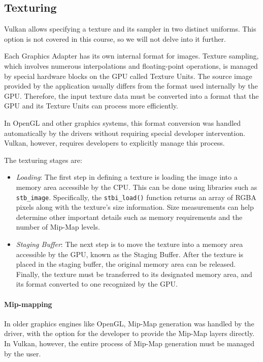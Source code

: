 \subsection{Texturing}
Vulkan allows specifying a texture and its sampler in two distinct uniforms. 
This option is not covered in this course, so we will not delve into it further.

Each Graphics Adapter has its own internal format for images.
Texture sampling, which involves numerous interpolations and floating-point operations, is managed by special hardware blocks on the GPU called Texture Units. 
The source image provided by the application usually differs from the format used internally by the GPU. 
Therefore, the input texture data must be converted into a format that the GPU and its Texture Units can process more efficiently.

In OpenGL and other graphics systems, this format conversion was handled automatically by the drivers without requiring special developer intervention. 
Vulkan, however, requires developers to explicitly manage this process.

The texturing stages are:
\begin{itemize}
    \item \textit{Loading}: The first step in defining a texture is loading the image into a memory area accessible by the CPU. 
        This can be done using libraries such as \texttt{stb\_image}. Specifically, the \texttt{stbi\_load()} function returns an array of RGBA pixels along with the texture's size information.
        Size measurements can help determine other important details such as memory requirements and the number of Mip-Map levels.
    \item \textit{Staging Buffer}: The next step is to move the texture into a memory area accessible by the GPU, known as the Staging Buffer. 
        After the texture is placed in the staging buffer, the original memory area can be released. 
        Finally, the texture must be transferred to its designated memory area, and its format converted to one recognized by the GPU.
\end{itemize}

\paragraph*{Mip-mapping}
In older graphics engines like OpenGL, Mip-Map generation was handled by the driver, with the option for the developer to provide the Mip-Map layers directly. 
In Vulkan, however, the entire process of Mip-Map generation must be managed by the user.